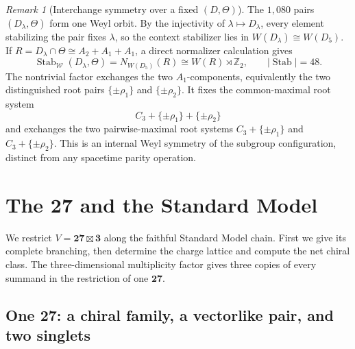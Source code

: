 \documentclass[11pt]{article}
\theoremstyle{remark}
\newtheorem*{remark}{Remark}
\begin{document}
\begin{remark}[Interchange symmetry over a fixed \((D,\Theta)\)]
The \(1{,}080\) pairs \((D_\lambda,\Theta)\) form one Weyl orbit. By the
injectivity of \(\lambda\mapsto D_\lambda\), every element stabilizing the
pair fixes \(\lambda\), so the context stabilizer lies in
\(W(D_\lambda)\cong W(D_5)\). If
\(R=D_\lambda\cap\Theta\cong A_2+A_1+A_1\), a direct normalizer calculation gives
\[
 \operatorname{Stab}_{\mathcal W}(D_\lambda,\Theta)
 =N_{W(D_5)}(R)
 \cong W(R)\rtimes\mathbb Z_2,
 \qquad |\operatorname{Stab}|=48.
\]
The nontrivial factor exchanges the two \(A_1\)-components, equivalently the
two distinguished root pairs \(\{\pm\rho_1\}\) and
\(\{\pm\rho_2\}\). It fixes the common-maximal root system
\[
 C_3+\{\pm\rho_1\}+\{\pm\rho_2\}
\]
and exchanges the two pairwise-maximal root systems
\(C_3+\{\pm\rho_1\}\) and \(C_3+\{\pm\rho_2\}\). This is an internal Weyl symmetry of the subgroup configuration, distinct
from any spacetime parity operation.
\end{remark}

\section{The \texorpdfstring{\(\mathbf{27}\)}{27} and the Standard Model}

We restrict \(V=\mathbf{27}\boxtimes\mathbf3\) along the faithful Standard
Model chain. First we give its complete branching, then determine the charge
lattice and compute the net chiral class. The three-dimensional multiplicity
factor gives three copies of every summand in the restriction of one
\(\mathbf{27}\).

\subsection{One \texorpdfstring{\(\mathbf{27}\)}{27}: a chiral family, a vectorlike pair, and two singlets}
\end{document}

